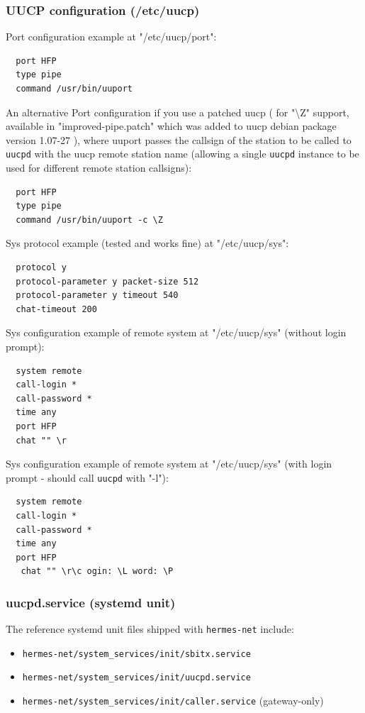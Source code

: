 \subsubsection{UUCP configuration (/etc/uucp)}
Port configuration example at "/etc/uucp/port":
\begin{verbatim}
  port HFP
  type pipe
  command /usr/bin/uuport    
\end{verbatim}

An alternative Port configuration if you use a patched uucp ( for "\textbackslash Z" support, available in "improved-pipe.patch" which was added to uucp debian package version 1.07-27 ), where uuport passes the callsign of the station to be called to \verb|uucpd| with the uucp remote station name (allowing a single \verb|uucpd| instance to be used for different remote station callsigns):
\begin{verbatim}
  port HFP
  type pipe
  command /usr/bin/uuport -c \Z
\end{verbatim}

Sys protocol example (tested and works fine) at "/etc/uucp/sys":
\begin{verbatim}
  protocol y
  protocol-parameter y packet-size 512
  protocol-parameter y timeout 540
  chat-timeout 200
\end{verbatim}

Sys configuration example of remote system at "/etc/uucp/sys" (without login prompt):
\begin{verbatim}
  system remote
  call-login *
  call-password *
  time any
  port HFP
  chat "" \r
\end{verbatim}

Sys configuration example of remote system at "/etc/uucp/sys" (with login prompt - should call \verb|uucpd| with "-l"):
\begin{verbatim}
  system remote
  call-login *
  call-password *
  time any
  port HFP
   chat "" \r\c ogin: \L word: \P
\end{verbatim}

\subsubsection{uucpd.service (systemd unit)}

The reference systemd unit files shipped with \verb|hermes-net| include:
\begin{itemize}
\item \verb|hermes-net/system_services/init/sbitx.service|
\item \verb|hermes-net/system_services/init/uucpd.service|
\item \verb|hermes-net/system_services/init/caller.service| (gateway-only)
\end{itemize}

